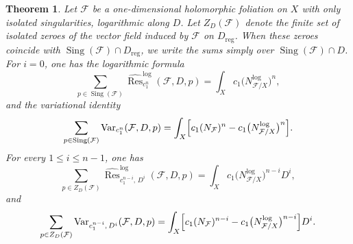 \documentclass[10pt,a4paper]{amsart}
\newtheorem{theorem}{Theorem}
\DeclareMathOperator{\Sing}{Sing}
\newcommand{\cF}{\mathcal{F}}
\begin{document}
\begin{theorem}\label{thm:residues}
Let \(\cF\) be a one-dimensional holomorphic foliation on \(X\) with only
isolated singularities, logarithmic along \(D\). Let \(Z_D(\cF)\) denote the
finite set of isolated zeroes of the vector field induced by \(\cF\) on
\(D_{\mathrm{reg}}\). When these zeroes coincide with
\(\Sing(\cF)\cap D_{\mathrm{reg}}\), we write the sums simply over
\(\Sing(\cF)\cap D\).
For \(i=0\), one has the logarithmic formula
\[
\sum_{p\in \Sing(\cF)}
\widehat{\operatorname{Res}}^{\log}_{c_1^n}(\cF,D,p)
=
\int_X c_1\bigl(N^{\log}_{\cF/X}\bigr)^n,
\]
and the variational identity
\[
\sum_{p\in \Sing(\cF)}
\operatorname{Var}_{c_1^n}(\cF,D,p)
=
\int_X
\Bigl[
c_1(N_{\cF})^n
-
c_1\bigl(N^{\log}_{\cF/X}\bigr)^n
\Bigr].
\]
For every \(1\leq i\leq n-1\), one has
\[
\sum_{p\in Z_D(\cF)}
\widehat{\operatorname{Res}}^{\log}_{c_1^{n-i},\,D^i}
(\cF,D,p)
=
\int_X c_1\bigl(N^{\log}_{\cF/X}\bigr)^{n-i}D^i,
\]
and
\[
\sum_{p\in Z_D(\cF)}
\operatorname{Var}_{c_1^{n-i},\,D^i}
(\cF,D,p)
=
\int_X
\Bigl[
c_1(N_{\cF})^{n-i}
-
c_1\bigl(N^{\log}_{\cF/X}\bigr)^{n-i}
\Bigr]D^i.
\]
\end{theorem}
\end{document}
